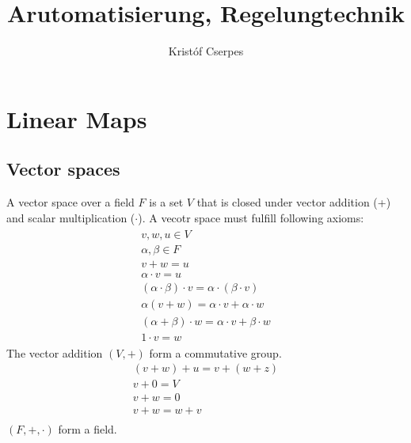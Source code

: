 \documentclass{book}
\title{Arutomatisierung, Regelungtechnik}
\author{Kristóf Cserpes}
\begin{document}
\maketitle
\tableofcontents
\chapter{Linear Maps}
\section{Vector spaces}
A vector space over a field \(F\) is a set \(V\) that is closed under vector addition (+) and scalar multiplication (\( \cdot \)). A vecotr space must fulfill following axioms:
\begin{align}
    \begin{split}
        v, w, u \in V \\
        \alpha, \beta \in F \\
        v + w = u  \\
        \alpha \cdot v = u \\
        (\alpha \cdot \beta) \cdot v = \alpha \cdot (\beta \cdot v)      \\
        \alpha (v + w) = \alpha \cdot v + \alpha \cdot w              \\
        (\alpha + \beta) \cdot w = \alpha \cdot v + \beta \cdot w \\
        1 \cdot v = w
    \end{split}
\end{align}
The vector addition \((V,+)\) form a commutative group.
\begin{align*}
    (v + w) + u = v + (w + z) \tag*{Associativity} \\
    v + 0 = V \tag*{Identity element: zero vector} \\
    v + w = 0 \tag*{Inverse element}               \\
    v + w  = w + v \tag*{Commutativity}            \\
\end{align*}
\( (F, +, \cdot)\) form a field.
\end{document}
